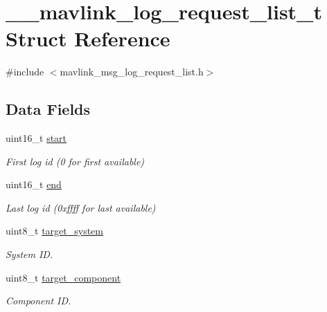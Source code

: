 \hypertarget{struct____mavlink__log__request__list__t}{\section{\+\_\+\+\_\+mavlink\+\_\+log\+\_\+request\+\_\+list\+\_\+t Struct Reference}
\label{struct____mavlink__log__request__list__t}
}


{\ttfamily \#include $<$mavlink\+\_\+msg\+\_\+log\+\_\+request\+\_\+list.\+h$>$}

\subsection*{Data Fields}
\begin{DoxyCompactItemize}
\item 
uint16\+\_\+t \hyperlink{struct____mavlink__log__request__list__t_a29bace0f7c80d2cf558afd956ec2e204}{start}
\begin{DoxyCompactList}\small\item\em First log id (0 for first available) \end{DoxyCompactList}\item 
uint16\+\_\+t \hyperlink{struct____mavlink__log__request__list__t_ac97d4cabe91086ded48e57e515a53697}{end}
\begin{DoxyCompactList}\small\item\em Last log id (0xffff for last available) \end{DoxyCompactList}\item 
uint8\+\_\+t \hyperlink{struct____mavlink__log__request__list__t_ac694149d3f3a2607e6c12d03551bb48d}{target\+\_\+system}
\begin{DoxyCompactList}\small\item\em System I\+D. \end{DoxyCompactList}\item 
uint8\+\_\+t \hyperlink{struct____mavlink__log__request__list__t_af2fa37e0302c439170d83f10f2906a3a}{target\+\_\+component}
\begin{DoxyCompactList}\small\item\em Component I\+D. \end{DoxyCompactList}\end{DoxyCompactItemize}


